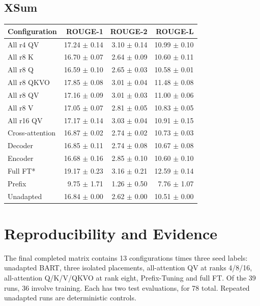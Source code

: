 \documentclass[11pt,letterpaper]{article}
\begin{document}
\subsection{XSum}
\begin{center}\small
\begin{tabular}{lrrr}\toprule Configuration & ROUGE-1 & ROUGE-2 & ROUGE-L\\\midrule
All r4 QV & 17.24 $\pm$ 0.14 & 3.10 $\pm$ 0.14 & 10.99 $\pm$ 0.10\\
All r8 K & 16.70 $\pm$ 0.07 & 2.64 $\pm$ 0.09 & 10.60 $\pm$ 0.11\\
All r8 Q & 16.59 $\pm$ 0.10 & 2.65 $\pm$ 0.03 & 10.58 $\pm$ 0.01\\
All r8 QKVO & 17.85 $\pm$ 0.08 & 3.01 $\pm$ 0.04 & 11.48 $\pm$ 0.08\\
All r8 QV & 17.16 $\pm$ 0.09 & 3.01 $\pm$ 0.03 & 11.00 $\pm$ 0.06\\
All r8 V & 17.05 $\pm$ 0.07 & 2.81 $\pm$ 0.05 & 10.83 $\pm$ 0.05\\
All r16 QV & 17.17 $\pm$ 0.14 & 3.03 $\pm$ 0.04 & 10.91 $\pm$ 0.15\\
Cross-attention & 16.87 $\pm$ 0.02 & 2.74 $\pm$ 0.02 & 10.73 $\pm$ 0.03\\
Decoder & 16.85 $\pm$ 0.11 & 2.74 $\pm$ 0.08 & 10.67 $\pm$ 0.08\\
Encoder & 16.68 $\pm$ 0.16 & 2.85 $\pm$ 0.10 & 10.60 $\pm$ 0.10\\
Full FT* & 19.17 $\pm$ 0.23 & 3.16 $\pm$ 0.21 & 12.59 $\pm$ 0.14\\
Prefix & 9.75 $\pm$ 1.71 & 1.26 $\pm$ 0.50 & 7.76 $\pm$ 1.07\\
Unadapted & 16.84 $\pm$ 0.00 & 2.62 $\pm$ 0.00 & 10.51 $\pm$ 0.00\\
\bottomrule\end{tabular}
\end{center}
\section{Reproducibility and Evidence}
The final completed matrix contains 13 configurations times three seed labels: unadapted BART, three isolated placements, all-attention QV at ranks 4/8/16, all-attention Q/K/V/QKVO at rank eight, Prefix-Tuning and full FT. Of the 39 runs, 36 involve training. Each has two test evaluations, for 78 total. Repeated unadapted runs are deterministic controls.
\end{document}
